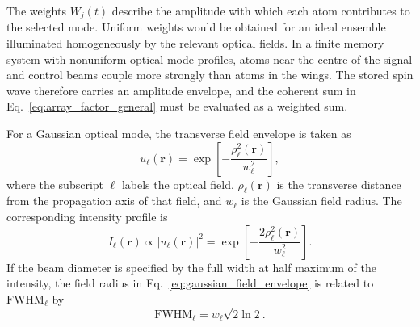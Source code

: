 %
The weights $W_j(t)$ describe the amplitude with which each atom contributes to the selected mode. Uniform weights would be obtained for an ideal ensemble illuminated homogeneously by the relevant optical fields. In a finite memory system with nonuniform optical mode profiles, atoms near the centre of the signal and control beams couple more strongly than atoms in the wings. The stored spin wave therefore carries an amplitude envelope, and the coherent sum in Eq.~\eqref{eq:array_factor_general} must be evaluated as a weighted sum.

For a Gaussian optical mode, the transverse field envelope is taken as
\begin{equation}
    u_{\ell}(\mathbf{r})
    =
    \exp\left[
        -\frac{\rho_{\ell}^2(\mathbf{r})}{w_{\ell}^2}
    \right],
    \label{eq:gaussian_field_envelope}
\end{equation}
where the subscript $\ell$ labels the optical field, $\rho_{\ell}(\mathbf{r})$ is the transverse distance from the propagation axis of that field, and $w_{\ell}$ is the Gaussian field radius. The corresponding intensity profile is
\begin{equation}
    I_{\ell}(\mathbf{r})
    \propto
    \left|
    u_{\ell}(\mathbf{r})
    \right|^2
    =
    \exp\left[
        -\frac{2\rho_{\ell}^2(\mathbf{r})}{w_{\ell}^2}
    \right].
    \label{eq:gaussian_intensity_profile}
\end{equation}
If the beam diameter is specified by the full width at half maximum of the intensity, the field radius in Eq.~\eqref{eq:gaussian_field_envelope} is related to $\mathrm{FWHM}_{\ell}$ by
\begin{equation}
    \mathrm{FWHM}_{\ell}
    =
    w_{\ell}\sqrt{2\ln 2}.
    \label{eq:fwhm_to_waist}
\end{equation}

